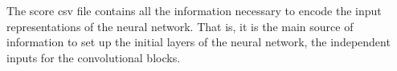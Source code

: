 
The score \gls{csv} file contains all the information
necessary to encode the input representations of the neural
network. That is, it is the main source of information to
set up the initial layers of the neural network, the
independent inputs for the convolutional blocks.
